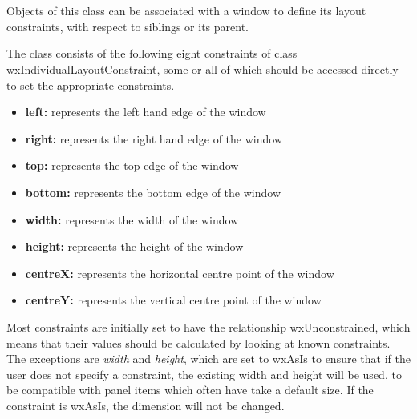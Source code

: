 \section{}\label{wxlayoutconstraints}

Objects of this class can be associated with a window to define its
layout constraints, with respect to siblings or its parent.

The class consists of the following eight constraints of class wxIndividualLayoutConstraint,
some or all of which should be accessed directly to set the appropriate
constraints.

\begin{itemize}\itemsep=0pt
\item {\bf left:} represents the left hand edge of the window
\item {\bf right:} represents the right hand edge of the window
\item {\bf top:} represents the top edge of the window
\item {\bf bottom:} represents the bottom edge of the window
\item {\bf width:} represents the width of the window
\item {\bf height:} represents the height of the window
\item {\bf centreX:} represents the horizontal centre point of the window
\item {\bf centreY:} represents the vertical centre point of the window
\end{itemize}

Most constraints are initially set to have the relationship wxUnconstrained,
which means that their values should be calculated by looking at known constraints.
The exceptions are {\it width} and {\it height}, which are set to wxAsIs to
ensure that if the user does not specify a constraint, the existing
width and height will be used, to be compatible with panel items which often
have take a default size. If the constraint is wxAsIs, the dimension will
not be changed.




